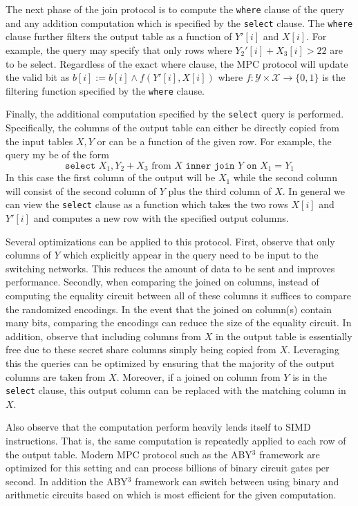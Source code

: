The next phase of the join protocol is to compute the \texttt{where} clause of the query and any addition computation which is specified by the \texttt{select} clause. The \texttt{where} clause further filters the output table as a function of $Y'[i]$ and $X[i]$. For example, the query may specify that only rows where $Y_2'[i] + X_3[i] > 22$  are to be select. Regardless of the exact where clause, the MPC protocol will update the valid bit as $b[i] := b[i] \wedge f(Y'[i], X[i])$ where $f: \mathcal{Y}\times \mathcal{X} \rightarrow \{0,1\}$ is the filtering function specified by the \texttt{where} clause.

Finally, the additional computation specified by the \texttt{select} query is performed. Specifically, the columns of the output table can either be directly copied from the input tables $X,Y$ or can be a function of the given row. For example, the query my be of the form 
$$
\texttt{select } X_1, Y_2 + X_3 \text{ from } X \texttt{ inner join } Y \texttt{ on } X_1 = Y_1
$$
In this case the first column of the output will be $X_1$ while the second column will consist of the second column of $Y$ plus the third column of $X$. In general we can view the \texttt{select} clause as a function which takes the two rows $X[i]$ and $Y'[i]$ and computes a new row with the specified output columns. 

Several optimizations can be applied to this protocol. First, observe that only columns of $Y$ which explicitly appear in the query need to be input to the switching networks. This reduces the amount of data to be sent and improves performance. Secondly, when comparing the joined on columns, instead of computing the equality circuit between all of these columns it suffices to compare the randomized encodings. In the event that the joined on column(s) contain many bits, comparing the encodings can reduce the size of the equality circuit. In addition, observe that including columns from $X$ in the output table is essentially free due to these secret share columns simply being copied from $X$. Leveraging this the queries can be optimized by ensuring that the majority of the output columns are taken from $X$. Moreover, if a joined on column from $Y$ is in the \texttt{select} clause, this output column can be replaced with the matching column in $X$.

Also observe that the computation perform heavily lends itself to SIMD instructions. That is, the same computation is repeatedly applied to each row of the output table. Modern MPC protocol such as the ABY$^3$ framework \cite{aby3,highthroughput} are optimized for this setting and can process billions of binary circuit gates per second\cite{highthroughput}. In addition the ABY$^3$ framework can switch between using binary and arithmetic circuits based on which is most efficient for the given computation. 

